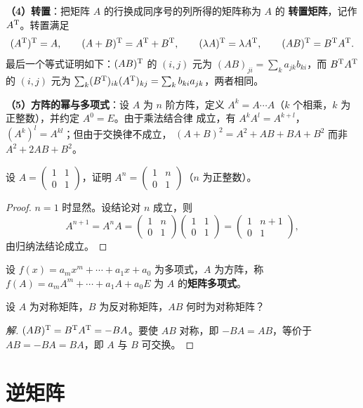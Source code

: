 \textbf{（4）转置}：把矩阵 $A$ 的行换成同序号的列所得的矩阵称为 $A$ 的
\textbf{转置矩阵}，记作 $A^{\mathrm{T}}$。转置满足
\[
  (A^{\mathrm{T}})^{\mathrm{T}}=A,\qquad (A+B)^{\mathrm{T}}=A^{\mathrm{T}}+B^{\mathrm{T}},\qquad
  (\lambda A)^{\mathrm{T}}=\lambda A^{\mathrm{T}},\qquad (AB)^{\mathrm{T}}=B^{\mathrm{T}} A^{\mathrm{T}} .
\]
最后一个等式证明如下：$(AB)^{\mathrm{T}}$ 的 $(i,j)$ 元为 $(AB)_{ji}
=\sum_k a_{jk}b_{ki}$，而 $B^{\mathrm{T}} A^{\mathrm{T}}$ 的 $(i,j)$ 元为
$\sum_k (B^{\mathrm{T}})_{ik}(A^{\mathrm{T}})_{kj}=\sum_k b_{ki}a_{jk}$，两者相同。

\textbf{（5）方阵的幂与多项式}：设 $A$ 为 $n$ 阶方阵，定义
$A^k=A\cdots A$（$k$ 个相乘，$k$ 为正整数），并约定 $A^0=E$。由于乘法结合律
成立，有 $A^kA^l=A^{k+l}$，$(A^k)^l=A^{kl}$；但由于交换律不成立，
$(A+B)^2=A^2+AB+BA+B^2$ 而非 $A^2+2AB+B^2$。

\begin{example}\label{ex:power}
设 $A=\begin{pmatrix} 1 & 1 \\ 0 & 1 \end{pmatrix}$，证明
$A^n=\begin{pmatrix} 1 & n \\ 0 & 1 \end{pmatrix}$（$n$ 为正整数）。
\end{example}
\begin{proof}
$n=1$ 时显然。设结论对 $n$ 成立，则
\[
  A^{n+1}=A^nA
  =\begin{pmatrix} 1 & n \\ 0 & 1 \end{pmatrix}
   \begin{pmatrix} 1 & 1 \\ 0 & 1 \end{pmatrix}
  =\begin{pmatrix} 1 & n+1 \\ 0 & 1 \end{pmatrix},
\]
由归纳法结论成立。
\end{proof}

设 $f(x)=a_mx^m+\cdots+a_1x+a_0$ 为多项式，$A$ 为方阵，称
$f(A)=a_mA^m+\cdots+a_1A+a_0E$ 为 $A$ 的\textbf{矩阵多项式}。

\begin{example}
设 $A$ 为对称矩阵，$B$ 为反对称矩阵，$AB$ 何时为对称矩阵？
\end{example}
\begin{proof}[解]
$(AB)^{\mathrm{T}}=B^{\mathrm{T}} A^{\mathrm{T}}=-BA$。要使 $AB$ 对称，即 $-BA=AB$，等价于
$AB=-BA=BA$，即 $A$ 与 $B$ 可交换。
\end{proof}

\section{逆矩阵}\label{sec:inverse}

